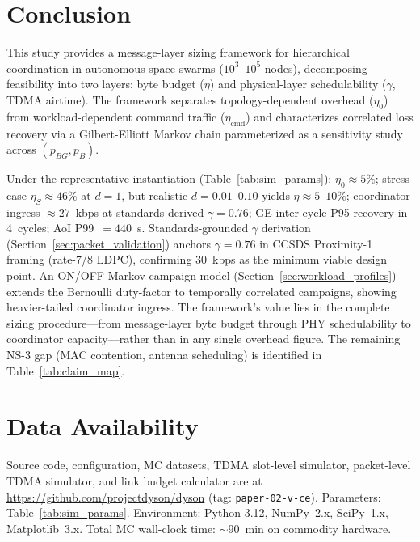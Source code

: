 \documentclass[journal]{IEEEtran}
\begin{document}
\section{Conclusion}

This study provides a message-layer sizing framework for hierarchical coordination in autonomous space swarms ($10^3$--$10^5$ nodes), decomposing feasibility into two layers: byte budget ($\eta$) and physical-layer schedulability ($\gamma$, TDMA airtime). The framework separates topology-dependent overhead ($\eta_0$) from workload-dependent command traffic ($\eta_{\text{cmd}}$) and characterizes correlated loss recovery via a Gilbert-Elliott Markov chain parameterized as a sensitivity study across $(p_{BG}, p_B)$.

Under the representative instantiation (Table~\ref{tab:sim_params}): $\eta_0 \approx 5\%$; stress-case $\eta_S \approx 46\%$ at $d = 1$, but realistic $d = 0.01$--$0.10$ yields $\eta \approx 5$--$10\%$; coordinator ingress ${\approx}27$~kbps at standards-derived $\gamma = 0.76$; GE inter-cycle P95 recovery in 4~cycles; AoI P99~$= 440$~s. Standards-grounded $\gamma$ derivation (Section~\ref{sec:packet_validation}) anchors $\gamma = 0.76$ in CCSDS Proximity-1 framing (rate-7/8 LDPC), confirming 30~kbps as the minimum viable design point. An ON/OFF Markov campaign model (Section~\ref{sec:workload_profiles}) extends the Bernoulli duty-factor to temporally correlated campaigns, showing heavier-tailed coordinator ingress. The framework's value lies in the complete sizing procedure---from message-layer byte budget through PHY schedulability to coordinator capacity---rather than in any single overhead figure. The remaining NS-3 gap (MAC contention, antenna scheduling) is identified in Table~\ref{tab:claim_map}.

\section*{Data Availability}

Source code, configuration, MC datasets, TDMA slot-level simulator, packet-level TDMA simulator, and link budget calculator are at \url{https://github.com/projectdyson/dyson} (tag: \texttt{paper-02-v-ce}). Parameters: Table~\ref{tab:sim_params}. Environment: Python 3.12, NumPy~2.x, SciPy~1.x, Matplotlib~3.x. Total MC wall-clock time: ${\sim}90$~min on commodity hardware.
\end{document}
